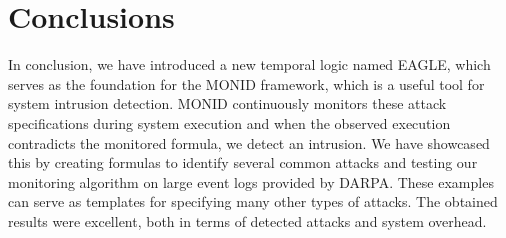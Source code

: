 \documentclass[english]{article}
\begin{document}
\section{Conclusions}
In conclusion, we have introduced a new temporal logic named EAGLE, which serves as the foundation for the MONID framework, which is a useful tool for system intrusion detection.
MONID continuously monitors these attack specifications during system execution and when the observed execution contradicts the monitored formula, we detect an intrusion. We have showcased this by creating formulas to identify several common attacks and testing our monitoring algorithm on large event logs provided by DARPA. These examples can serve as templates for specifying many other types of attacks. The obtained results were excellent, both in terms of detected attacks and system overhead.

\printbibliography
\end{document}
